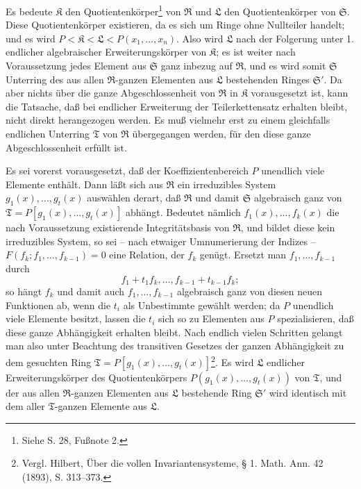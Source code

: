 Es bedeute $\mathfrak K$ den Quotientenkörper\footnote{Siehe S. 28, Fußnote 2.} von $\mathfrak R$ und $\mathfrak L$ den Quotientenkörper von $\mathfrak S$. Diese Quotientenkörper existieren, da es sich um Ringe ohne Nullteiler handelt; und es wird $P<\mathfrak K<\mathfrak L<P(x_1,\ldots,x_n)$. Also wird $\mathfrak L$ nach der Folgerung unter 1. endlicher algebraischer Erweiterungskörper von $\mathfrak K$; es ist weiter nach Voraussetzung jedes Element aus $\mathfrak S$ ganz inbezug auf $\mathfrak R$, und es wird somit $\mathfrak S$ Unterring des aus allen $\mathfrak R$-ganzen Elementen aus $\mathfrak L$ bestehenden Ringes $\mathfrak S'$. Da aber nichts über die ganze Abgeschlossenheit von $\mathfrak R$ in $\mathfrak K$ vorausgesetzt ist, kann die Tatsache, daß bei endlicher Erweiterung der Teilerkettensatz erhalten bleibt, nicht direkt herangezogen werden. Es muß vielmehr erst zu einem gleichfalls endlichen Unterring $\mathfrak T$ von $\mathfrak R$ übergegangen werden, für den diese ganze Abgeschlossenheit erfüllt ist.

Es sei vorerst vorausgesetzt, daß der Koeffizientenbereich $P$ unendlich viele Elemente enthält. Dann läßt sich aus $\mathfrak R$ ein irreduzibles System $g_1(x),\ldots,g_t(x)$ auswählen derart, daß $\mathfrak R$ und damit $\mathfrak S$ algebraisch ganz von $\mathfrak T=P[g_1(x),\ldots,g_t(x)]$ abhängt. Bedeutet nämlich $f_1(x),\ldots,f_k(x)$ die nach Voraussetzung existierende Integritätsbasis von $\mathfrak R$, und bildet diese kein irreduzibles System, so sei -- nach etwaiger Umnumerierung der Indizes -- $F(f_k;f_1,\ldots,f_{k-1})=0$ eine Relation, der $f_k$ genügt. Ersetzt man $f_1,\ldots,f_{k-1}$ durch
\[
 f_1+t_1f_k,\ldots,f_{k-1}+t_{k-1}f_k;
\]
so hängt $f_k$ und damit auch $f_1,\ldots,f_{k-1}$ algebraisch ganz von diesen neuen Funktionen ab, wenn die $t_i$ als Unbestimmte gewählt werden; da $P$ unendlich viele Elemente besitzt, lassen die $t_i$ sich so zu Elementen aus $P$ spezialisieren, daß diese ganze Abhängigkeit erhalten bleibt. Nach endlich vielen Schritten gelangt man also unter Beachtung des transitiven Gesetzes der ganzen Abhängigkeit zu dem gesuchten Ring $\mathfrak T=P[g_1(x),\ldots,g_t(x)]$\footnote{Vergl. Hilbert, Über die vollen Invariantensysteme, § 1. Math. Ann. 42 (1893), S. 313--373.}. Es wird $\mathfrak L$ endlicher Erweiterungskörper des Quotientenkörpers $P(g_1(x),\ldots,g_t(x))$ von $\mathfrak T$, und der aus allen $\mathfrak R$-ganzen Elementen aus $\mathfrak L$ bestehende Ring $\mathfrak S'$ wird identisch mit dem aller $\mathfrak T$-ganzen Elemente aus $\mathfrak L$.

